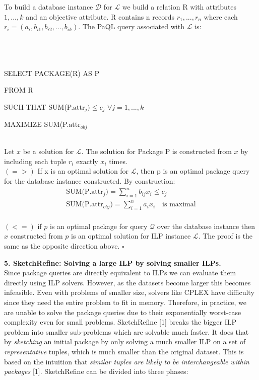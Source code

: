 \documentclass[a4paper,12pt]{article}
\begin{document}
To build a database instance $\mathcal{D}$ for $\mathcal{L}$ we build a relation R with attributes $1,...,k$ and an objective attribute. R contains n records $r_1, ..., r_n$ where each $r_i = (a_i, b_{i1}, b_{i2}, ... , b_{ik})$. The PaQL query associated with $\mathcal{L}$ is:
\\\\\\\\

{\large SELECT \space\space\space\space\space\space\space\space\space PACKAGE(R) AS P\par}
{\large FROM \space\space\space\space\space\space\space\space\space\space\space\space R \par}
{\large SUCH THAT \space\space\space SUM(P.$\text{attr}_j) \leq c_j$ \space\space $\forall j = 1,... ,k$ \par}
{\large MAXIMIZE \space\space\space\space\space SUM(P.$\text{attr}_{obj}$\par}
\\
\vspace{4mm}
Let $x$ be a solution for $\mathcal{L}$. The solution for Package P is constructed from $x$ by including each tuple $r_i$ exactly $x_i$ times.
\\

$(=>)$
If x is an optimal solution for $\mathcal{L}$, then p is an optimal package query for the database instance constructed. By construction:
\begin{gather}
\text{SUM(P.$\text{attr}_j$)} = \sum_{i=1}^{n} b_{ij} x_i \leq c_j \\
\text{SUM(P.$\text{attr}_{obj}$)} = \sum_{i=1}^{n} a_i x_i \quad \text{is maximal}
\end{gather}
\\
$(<=)$
if $p$ is an optimal package for query $\mathcal{Q}$ over the database instance then $x$ constructed from $p$ is an optimal solution for ILP instance $\mathcal{L}$. The proof is the same as the opposite direction above. $\square$

\vspace{5mm}
\textbf{5. SketchRefine: Solving a large ILP by solving smaller ILPs.}
\\

Since package queries are directly equivalent to ILPs we can evaluate them directly using ILP solvers. However, as the datasets become larger this becomes infeasible. Even with problems of smaller size, solvers like CPLEX have difficulty since they need the entire problem to fit in memory. Therefore, in practice, we are unable to solve the package queries due to their exponentially worst-case complexity even for small problems. SketchRefine [1] breaks the bigger ILP problem into smaller sub-problems which are solvable much faster. It does that by \textit{sketching} an initial package by only solving a much smaller ILP on a set of \textit{representative} tuples, which is much smaller than the original dataset. This is based on the intuition that \textit{similar tuples are likely to be interchangeable within packages} [1]. SketchRefine can be divided into three phases:
\\
\end{document}
